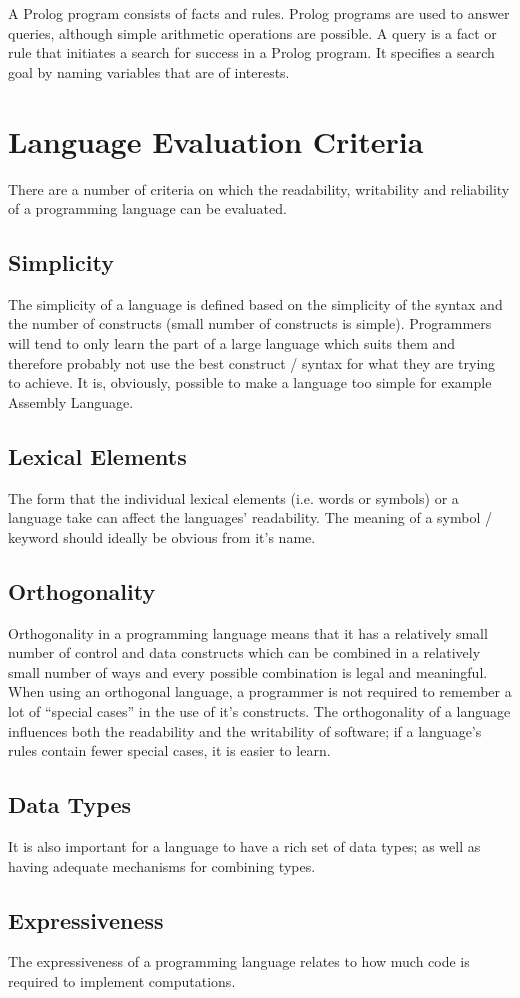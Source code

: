 A Prolog program consists of facts and rules. Prolog programs are used to answer queries, although simple arithmetic operations are possible. A query is a fact or rule that initiates a search for success in a Prolog program. It specifies a search goal by naming variables that are of interests. 

\section{Language Evaluation Criteria}
There are a number of criteria on which the readability, writability and reliability of a programming language can be evaluated.
\subsection{Simplicity}
The simplicity of a language is defined based on the simplicity of the syntax and the number of constructs (small number of constructs is simple). Programmers will tend to only learn the part of a large language which suits them and therefore probably not use the best construct / syntax for what they are trying to achieve. It is, obviously, possible to make a language too simple for example Assembly Language. 

\subsection{Lexical Elements}
The form that the individual lexical elements (i.e. words or symbols) or a language take can affect the languages' readability. The meaning of a symbol / keyword should ideally be obvious from it's name. 

\subsection{Orthogonality}
Orthogonality in a programming language means that it has a relatively small number of control and data constructs which can be combined in a relatively small number of ways and every possible combination is legal and meaningful. When using an orthogonal language, a programmer is not required to remember a lot of ``special cases'' in the use of it's constructs. The orthogonality of a language influences both the readability and the writability of software; if a language's rules contain fewer special cases, it is easier to learn. 

\subsection{Data Types}
It is also important for a language to have a rich set of data types; as well as having adequate mechanisms for combining types. 

\subsection{Expressiveness}
The expressiveness of a programming language relates to how much code is required to implement computations. 